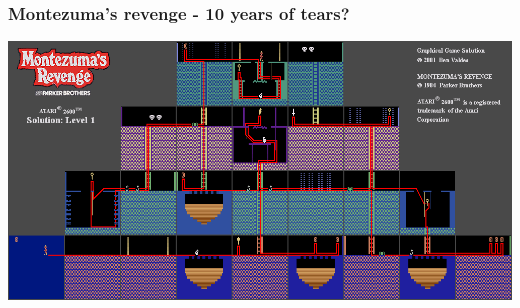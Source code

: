 \documentclass{beamer}
\begin{document}
\begin{frame}
  
  \frametitle{Montezuma's revenge - 10 years of tears?} 

  \centering
  \includegraphics[scale=0.3]{../images/montezuma_level_1.png}

\end{frame}
\end{document}
